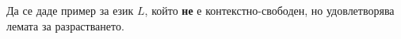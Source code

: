 \begin{problem}
  Да се даде пример за език $L$, който {\bf не} е контекстно-свободен, но удовлетворява
  лемата за разрастването.
\end{problem}




